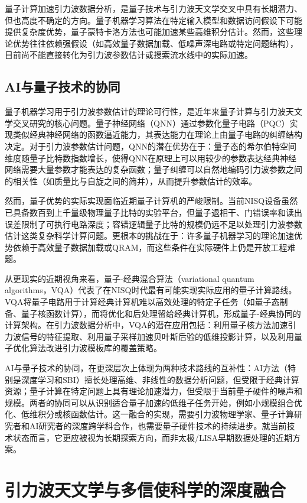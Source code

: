 量子计算加速引力波数据分析，是量子技术与引力波天文学交叉中具有长期潜力、但也高度不确定的方向。量子机器学习算法在特定输入模型和数据访问假设下可能提供复杂度优势，量子蒙特卡洛方法也可能加速某些高维积分估计。然而，这些理论优势往往依赖强假设（如高效量子数据加载、低噪声深电路或特定问题结构），目前尚不能直接转化为引力波参数估计或搜索流水线中的实际加速。

\subsection{AI与量子技术的协同}

量子机器学习用于引力波参数估计的理论可行性，是近年来量子计算与引力波天文学交叉研究的核心问题。量子神经网络（QNN）通过参数化量子电路（PQC）实现类似经典神经网络的函数逼近能力，其表达能力在理论上由量子电路的纠缠结构决定。对于引力波参数估计问题，QNN的潜在优势在于：量子态的希尔伯特空间维度随量子比特数指数增长，使得QNN在原理上可以用较少的参数表达经典神经网络需要大量参数才能表达的复杂函数；量子纠缠可以自然地编码引力波参数之间的相关性（如质量比与自旋之间的简并），从而提升参数估计的效率。

然而，量子优势的实际实现面临近期量子计算机的严峻限制。当前NISQ设备虽然已具备数百到上千量级物理量子比特的实验平台，但量子退相干、门错误率和读出误差限制了可执行电路深度；容错逻辑量子比特的规模仍远不足以处理引力波参数估计这类复杂科学计算问题。更根本的挑战在于：许多量子机器学习的理论加速优势依赖于高效量子数据加载或QRAM，而这些条件在实际硬件上仍是开放工程难题。

从更现实的近期视角来看，量子-经典混合算法（variational quantum algorithms，VQA）代表了在NISQ时代最有可能实现实际应用的量子计算路线。VQA将量子电路用于计算经典计算机难以高效处理的特定子任务（如量子态制备、量子核函数计算），而将优化和后处理留给经典计算机，形成量子-经典协同的计算架构。在引力波数据分析中，VQA的潜在应用包括：利用量子核方法加速引力波信号的特征提取、利用量子采样加速贝叶斯后验的低维投影计算，以及利用量子优化算法改进引力波模板库的覆盖策略。

AI与量子技术的协同，在更深层次上体现为两种技术路线的互补性：AI方法（特别是深度学习和SBI）擅长处理高维、非线性的数据分析问题，但受限于经典计算资源；量子计算在特定问题上具有理论加速潜力，但受限于当前量子硬件的噪声和规模。两者的协同可以从识别适合量子加速的低维子任务开始，例如小规模组合优化、低维积分或核函数估计。这一融合的实现，需要引力波物理学家、量子计算研究者和AI研究者的深度跨学科合作，也需要量子硬件技术的持续进步。就当前技术状态而言，它更应被视为长期探索方向，而非太极/LISA早期数据处理的近期方案。

\section{引力波天文学与多信使科学的深度融合}

